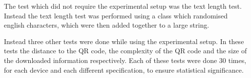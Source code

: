 The test which did not require the experimental setup was the text length test. Instead the text length test was performed using a class which randomised english characters, which were then added together to a large string.

Instead three other tests were done while using the experimental setup. In these tests the distance to the QR code, the complexity of the QR code and the size of the downloaded information respectively. Each of these tests were done 30 times, for each device and each different specification, to ensure statistical significance.